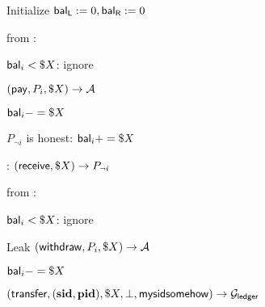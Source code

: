 \begin{bbox}[title={$\Fpay (P_L,P_R)$}]

Initialize ${\mathsf {bal_L}} := 0, {\mathsf {bal_R}} := 0$

\OnInput {} from \Partyi:

	\quad \If ${\mathsf {bal}}_i < \$X$: ignore  

	\quad \Leak $({\mathsf {pay}},P_i,\$X) \rightarrow \mathcal{A}$

	\quad ${\mathsf {bal}}_i -= \$X$

	\quad \If $P_{\neg i}$ is honest: ${\mathsf {bal}}_i += \$X$

	\quad \Else: \Buffer $({\mathsf {receive}},\$X) \rightarrow P_{\neg i}$ 

\OnInput {} from \Partyi:

	\quad \If ${\mathsf {bal}}_i < \$X$: ignore

	\quad Leak $({\mathsf {withdraw}},P_i,\$X) \rightarrow \mathcal{A}$

	\quad ${\mathsf {bal}}_i -= \$X$

	\quad \Send $({\mathsf {transfer}}, (\mathbf{sid},\mathbf{pid}), \$X, \bot, {\mathsf {mysidsomehow}}) \rightarrow \mathcal{G}_{{\mathsf {ledger}}}$
\end{bbox}
